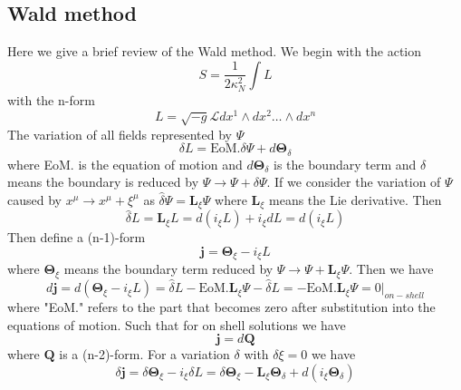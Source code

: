 \documentclass[a4paper,12pt]{article}
\numberwithin{equation}{section}
\begin{document}
\begin{appendix}
\section{Wald method}
Here we give a brief review of the Wald method. We begin with the action
\begin{equation}
    S=\frac{1}{2\kappa_N^2}\int L
\end{equation}
with the n-form 
\begin{equation}
    L=\sqrt{-g}\mathcal{L} dx^1\wedge dx^2\dots \wedge dx^{n}
\end{equation}
The variation of all fields represented by $\Psi$
\begin{equation}
    \delta L=\text{EoM.} \delta \Psi +d\mathbf{\Theta}_\delta
\end{equation}
where EoM. is the equation of motion and $d\mathbf{\Theta}_\delta$ is the boundary term and $\delta$ means the boundary is reduced by $\Psi\rightarrow \Psi+\delta \Psi$. If we consider the variation of $\Psi$ caused by $x^\mu\rightarrow x^\mu+\xi^\mu$ as $\hat{\delta}\Psi=\mathbf{L}_\xi \Psi$ where $\mathbf{L}_\xi$ means the Lie derivative. Then
\begin{equation}
    \hat{\delta}L=\mathbf{L}_{\xi}L=d\left( i_\xi L \right)+i_\xi dL=d\left( i_\xi L \right)
\end{equation}
Then define a (n-1)-form
\begin{equation}
    \mathbf{j}=\mathbf{\Theta}_\xi -i_\xi L
\end{equation}
where $\mathbf{\Theta}_\xi$ means the boundary term reduced by $\Psi\rightarrow \Psi+\mathbf{L}_\xi \Psi$. Then we have 
\begin{equation}
    d\mathbf{j}=d\left(\mathbf{\Theta}_\xi -i_\xi L\right)=\hat{\delta}L-\text{EoM.} \mathbf{L}_\xi \Psi -\hat{\delta}L=-\text{EoM.} \mathbf{L}_\xi \Psi=\left. 0\right|_{on-shell}
\end{equation}
where "EoM." refers to the part that becomes zero after substitution into the equations of motion. Such that for on shell solutions we have
\begin{equation}
    \mathbf{j}=d\mathbf{Q}
\end{equation}
where $\mathbf{Q}$ is a (n-2)-form. For a variation $\delta$ with $\delta \xi=0$ we have
\begin{equation}
    \delta \mathbf{j}=\delta \mathbf{\Theta}_\xi -i_\xi \delta L=\delta \mathbf{\Theta}_\xi-\mathbf{L}_\xi \mathbf{\Theta}_\delta +d\left(i_\xi \mathbf{\Theta}_\delta\right)

\end{equation}
\end{appendix}
\end{document}

